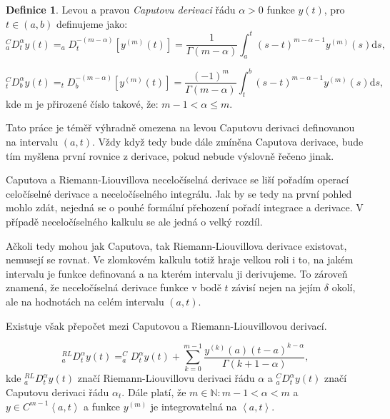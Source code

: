 \documentclass[a4paper,12pt,twoside]{article}
\theoremstyle{definition}
\newtheorem{defin}[veta]{Definice}
\theoremstyle{remark}
\numberwithin{equation}{section}
\numberwithin{table}{section}
\numberwithin{figure}{section}
\newcommand{\dx}[1]{\mathrm{d} #1}
\newcommand{\N}{\mathbb{N}}
\begin{document}
\begin{defin}%
	Levou a pravou \emph{Caputovu derivaci} řádu $\alpha > 0$ funkce $y\left(t\right)$, pro $t \in \left(a,b\right) $ definujeme jako:
\begin{equation} \label{CaputoDerivace} ^{C}_{a}D_{t}^{\alpha} y\left(t\right) = _{a}D_{t}^{- \left(m-\alpha\right) }\left[y^{\left(m\right)} \left(t\right)\right] = \frac{1}{\Gamma\left(m-\alpha\right)} \int_{a}^{t} \left(s-t\right)^{m-\alpha-1}y^{\left(m\right)} \left(s\right) \dx s,\end{equation}

$$^{C}_{t}D_{b}^{\alpha} y\left(t\right) = _{t}D_{b}^{- \left(m-\alpha\right) }\left[y^{\left(m\right)} \left(t\right)\right] = \frac{\left(-1\right)^m}{\Gamma\left(m-\alpha\right)} \int_{t}^{b} \left(s-t\right)^{m-\alpha-1}y^{\left(m\right)} \left(s\right) \dx s,$$
kde m je přirozené číslo takové, že: $m-1<\alpha\leq m$.
\end{defin}

Tato práce je téměř výhradně omezena na levou Caputovu derivaci definovanou na intervalu $\left(a, t\right)$. Vždy když tedy bude dále zmíněna Caputova derivace, bude tím myšlena první rovnice z derivace, pokud nebude výslovně řečeno jinak.

Caputova a Riemann-Liouvillova neceločíselná derivace se liší pořadím operací celočíselné derivace a neceločíselného integrálu. Jak by se tedy na první pohled mohlo zdát, nejedná se o  pouhé formální přehození pořadí integrace a derivace. V případě neceločíselného kalkulu se ale jedná o velký rozdíl.

Ačkoli tedy mohou jak Caputova, tak Riemann-Liouvillova derivace existovat, nemusejí se rovnat.
Ve zlomkovém kalkulu totiž hraje velkou roli i to, na jakém intervalu je funkce definovaná a na kterém intervalu ji derivujeme. To zároveň znamená, že neceločíselná derivace funkce v bodě $t$ závisí nejen na jejím $\delta$ okolí, ale na hodnotách na celém intervalu $\left(a, t\right)$.

Existuje však přepočet mezi Caputovou a Riemann-Liouvillovou derivací.

\begin{equation}\label{PrepocetRL->C1}
	_{a}^{RL}D^{\alpha}_{t} y\left(t\right) =  _{a}^{C}D^{\alpha}_{t} y\left(t\right) + \sum_{k=0}^{m-1} \frac{y^{\left(k\right)}\left(a\right)\left(t-a\right)^{k-\alpha}}{\Gamma\left(k+1-\alpha\right)},
\end{equation}
kde $_{a}^{RL}D^{\alpha}_{t} y\left(t\right)$ značí Riemann-Liouvillovu derivaci řádu $\alpha$ a $_{a}^{C}D^{\alpha}_{t} y\left(t\right)$ značí Caputovu derivaci řádu $\alpha_{t}$. Dále platí, že $m \in \N: m-1<\alpha<m$ a $y\in C^{m-1}\left<a, t\right>$ a funkce $y^{\left(m\right)}$ je integrovatelná na $\left< a, t \right>$.
\end{document}
